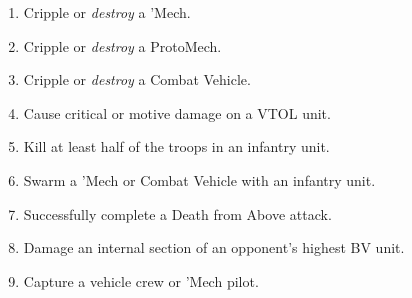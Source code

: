 \begin{enumerate}

\item Cripple or \emph{destroy} a 'Mech.

\item Cripple or \emph{destroy} a ProtoMech.

\item Cripple or \emph{destroy} a Combat Vehicle.

\item Cause critical or motive damage on a VTOL unit.

\item Kill at least half of the troops in an infantry unit.

\item Swarm a 'Mech or Combat Vehicle with an infantry unit.

\item Successfully complete a Death from Above attack.

\item Damage an internal section of an opponent's highest BV unit.

\item Capture a vehicle crew or 'Mech pilot.

\end{enumerate}
